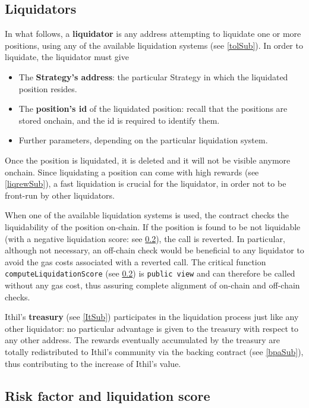 \documentclass[a4paper,10 pt]{article}
\theoremstyle{definition}
\begin{document}
\subsection{Liquidators}\label{liqSub}
In what follows, a {\bf liquidator} is any address attempting to liquidate one or more positions, using any of the available liquidation systems (see \ref{tolSub}). In order to liquidate, the liquidator must give
\begin{itemize}
\item The {\bf Strategy's address}: the particular Strategy in which the liquidated position resides.
\item The {\bf position's id} of the liquidated position: recall that the positions are stored onchain, and the id is required to identify them.
\item Further parameters, depending on the particular liquidation system.
\end{itemize}

Once the position is liquidated, it is deleted and it will not be visible anymore onchain. Since liquidating a position can come with high rewards (see \ref{liqrewSub}), a fast liquidation is crucial for the liquidator, in order not to be front-run by other liquidators.

When one of the available liquidation systems is used, the contract checks the liquidability of the position on-chain. If the position is found to be not liquidable (with a negative liquidation score: see \ref{rflsSub}), the call is reverted. In particular, although not necessary, an off-chain check would be beneficial to any liquidator to avoid the gas costs associated with a reverted call. The critical function \verb|computeLiquidationScore| (see \ref{rflsSub}) is \verb|public view| and can therefore be called without any gas cost, thus assuring complete alignment of on-chain and off-chain checks.

Ithil's {\bf treasury} (see \ref{ItSub}) participates in the liquidation process just like any other liquidator: no particular advantage is given to the treasury with respect to any other address. The rewards eventually accumulated by the treasury are totally redistributed to Ithil's community via the backing contract (see \ref{bpaSub}), thus contributing to the increase of Ithil's value.

\subsection{Risk factor and liquidation score}\label{rflsSub}
\end{document}
